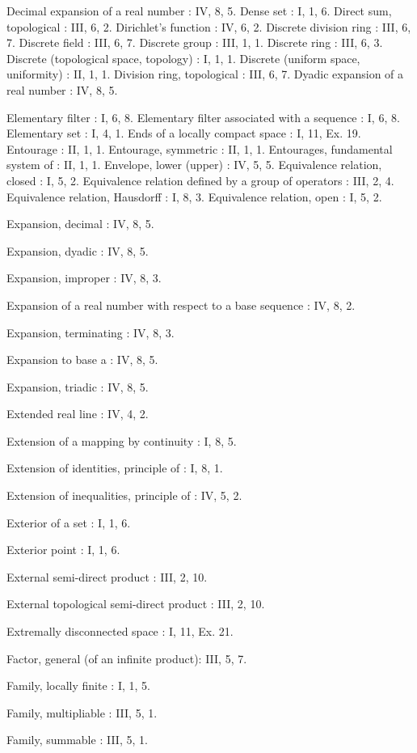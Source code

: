 Decimal expansion of a real number : IV, 8, 5. Dense set : I, 1, 6. Direct sum, topological : III, 6, 2. Dirichlet's function : IV, 6, 2. Discrete division ring : III, 6, 7. Discrete field : III, 6, 7. Discrete group : III, 1, 1. Discrete ring : III, 6, 3. Discrete (topological space, topology) : I, 1, 1. Discrete (uniform space, uniformity) : II, 1, 1. Division ring, topological : III, 6, 7. Dyadic expansion of a real number : IV, 8, 5.

Elementary filter : I, 6, 8. Elementary filter associated with a sequence : I, 6, 8. Elementary set : I, 4, 1. Ends of a locally compact space : I, 11, Ex. 19. Entourage : II, 1, 1. Entourage, symmetric : II, 1, 1. Entourages, fundamental system of : II, 1, 1. Envelope, lower (upper) : IV, 5, 5. Equivalence relation, closed : I, 5, 2. Equivalence relation defined by a group of operators : III, 2, 4. Equivalence relation, Hausdorff : I, 8, 3. Equivalence relation, open : I, 5, 2.

Expansion, decimal : IV, 8, 5.

Expansion, dyadic : IV, 8, 5.

Expansion, improper : IV, 8, 3.

Expansion of a real number with respect to a base sequence : IV, 8, 2.

Expansion, terminating : IV, 8, 3.

Expansion to base a : IV, 8, 5.

Expansion, triadic : IV, 8, 5.

Extended real line : IV, 4, 2.

Extension of a mapping by continuity : I, 8, 5.

Extension of identities, principle of : I, 8, 1.

Extension of inequalities, principle of : IV, 5, 2.

Exterior of a set : I, 1, 6.

Exterior point : I, 1, 6.

External semi-direct product : III, 2, 10.

External topological semi-direct product : III, 2, 10.

Extremally disconnected space : I, 11, Ex. 21.

Factor, general (of an infinite product): III, 5, 7.

Family, locally finite : I, 1, 5.

Family, multipliable : III, 5, 1.

Family, summable : III, 5, 1.

